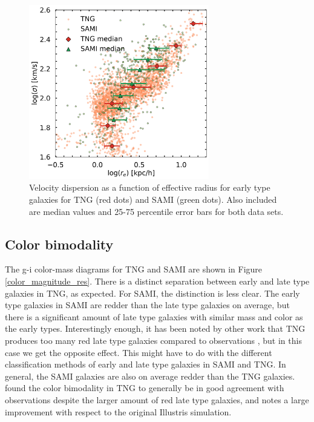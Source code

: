 \begin{figure}
    \centering
    \includegraphics[width=0.7\textwidth]{images/results_sigma_radius_FP.png}
    \caption{Velocity dispersion as a function of effective radius for early type galaxies for TNG (red dots) and SAMI (green dots). Also included are median values and 25-75 percentile error bars for both data sets.}
    \label{FP_res2}
\end{figure}

\newpage

\subsection{Color bimodality}
The g-i color-mass diagrams for TNG and SAMI are shown in Figure \ref{color_magnitude_res}. There is a distinct separation between early and late type galaxies in TNG, as expected. For SAMI, the distinction is less clear. The early type galaxies in SAMI are redder than the late type galaxies on average, but there is a significant amount of late type galaxies with similar mass and color as the early types. Interestingly enough, it has been noted by other work that TNG produces too many red late type galaxies compared to observations \parencite{Nelson2017}, but in this case we get the opposite effect. This might have to do with the different classification methods of early and late type galaxies in SAMI and TNG. In general, the SAMI galaxies are also on average redder than the TNG galaxies. \textcite{Nelson2017} found the color bimodality in TNG to generally be in good agreement with observations despite the larger amount of red late type galaxies, and notes a large improvement with respect to the original Illustris simulation.


